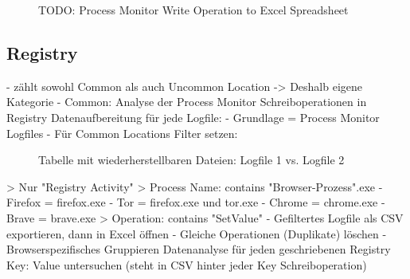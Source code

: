 \begin{figure}[h!]
	\centering
	\small
	\centerline{\resizebox{\linewidth}{!}{}}
	\caption{TODO: Process Monitor Write Operation to Excel Spreadsheet}
	\label{fig:jes}
\end{figure}


\subsection{Registry}
- zählt sowohl Common als auch Uncommon Location -> Deshalb eigene Kategorie
- Common: Analyse der Process Monitor Schreiboperationen in Registry
	Datenaufbereitung für jede Logfile:
	- Grundlage = Process Monitor Logfiles
	- Für Common Locations Filter setzen: 
		\begin{figure}[h!]
			\caption{Tabelle mit wiederherstellbaren Dateien: Logfile 1 vs. Logfile 2}
		\end{figure}	
		> Nur "Registry Activity"
		> Process Name: contains "Browser-Prozess".exe
			- Firefox = firefox.exe
			- Tor = firefox.exe und tor.exe
			- Chrome = chrome.exe
			- Brave = brave.exe
		> Operation: contains "SetValue"
	- Gefiltertes Logfile als CSV exportieren, dann in Excel öffnen
	- Gleiche Operationen (Duplikate) löschen
	- Browserspezifisches Gruppieren 
	Datenanalyse für jeden geschriebenen Registry Key: Value untersuchen (steht in CSV hinter jeder Key Schreiboperation)
	

